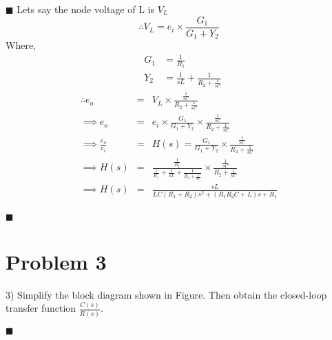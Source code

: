 \documentclass[12pt,technote,a4paper,onecolumn]{IEEEtran}
\begin{document}
$\blacksquare$
Lets say the node voltage of L is $V_L$
\begin{equation}
\therefore V_L = e_i \times \frac{G_1}{G_1+Y_2}
\end{equation}
Where, 
\begin{eqnarray}
&G_1 &=\frac{1}{R_1} \nonumber \\
&Y_2 &=\frac{1}{sL}+\frac{1}{R_2+\frac{1}{sC}} \nonumber
\end{eqnarray}
\begin{eqnarray}
\therefore e_o &= &V_L \times \frac{\frac{1}{sC}}{R_2+\frac{1}{sC}}\\
\implies e_o &= &e_i \times \frac{G_1}{G_1+Y_2} \times \frac{\frac{1}{sC}}{R_2+\frac{1}{sC}} \nonumber\\
\implies \frac{e_o}{e_i} &= &H(s) = \frac{G_1}{G_1+Y_2} \times \frac{\frac{1}{sC}}{R_2+\frac{1}{sC}} \nonumber\\
\implies H(s) &= &\frac{\frac{1}{R_1}}{\frac{1}{R_1}+\frac{1}{sL}+\frac{1}{R_2+\frac{1}{sC}}} \times \frac{\frac{1}{sC}}{R_2+\frac{1}{sC}} \nonumber\\
\implies H(s) &= &\frac{sL}{LC(R_1+R_2)s^2 + (R_1 R_2 C+L) s + R_1}
\end{eqnarray}\\


\hfill $\blacksquare$
\newpage


\section{Problem 3}
3) Simplify the block diagram shown in Figure. Then obtain the closed-loop transfer function $\frac{C(s)}{R(s)}$.



\vspace{10pt}
$\blacksquare$
\end{document}

